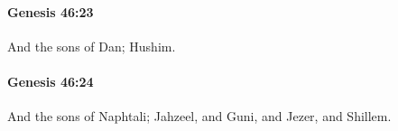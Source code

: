 		\paragraph{Genesis 46:23} %
			\label{GENESIS-46-23}

			And the sons of Dan; Hushim.


		\paragraph{Genesis 46:24} %
			\label{GENESIS-46-24}

			And the sons of Naphtali; Jahzeel, and Guni, and Jezer, and Shillem.


